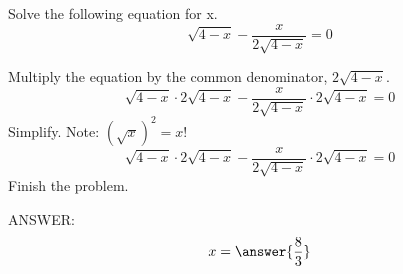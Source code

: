 \documentclass{ximera}
\author{Nela Lakos}
\begin{document}
\begin{exercise}
Solve the following equation for x.
\[
\sqrt{4-x}-\frac{x}{2\sqrt{4-x}}=0
\]
\begin{hint}

Multiply the equation by the common denominator, $2\sqrt{4-x}$.
\[
\sqrt{4-x}\cdot2\sqrt{4-x}-\frac{x}{2\sqrt{4-x}}\cdot2\sqrt{4-x}=0
\]
Simplify. Note: $(\sqrt{x})^2=x$!
\[
\sqrt{4-x}\cdot2\sqrt{4-x}-\frac{x}{2\sqrt{4-x}}\cdot2\sqrt{4-x}=0
\]
Finish the problem.
\end{hint}
ANSWER: 
\[
x=\answer{\frac{8}{3}}
\]
\end{exercise}
\end{document}

